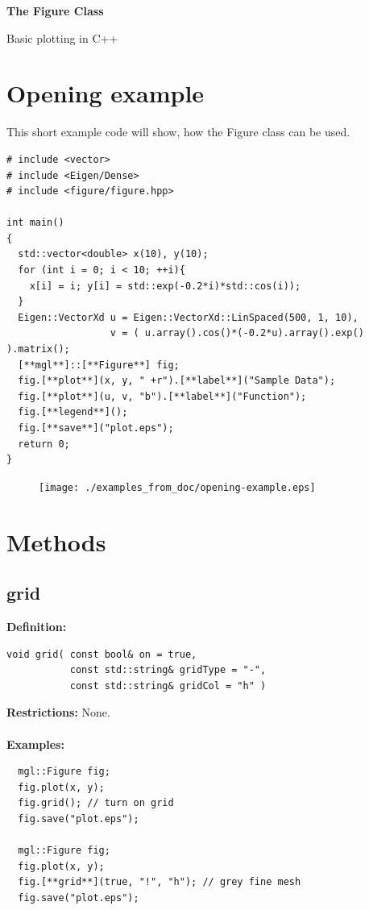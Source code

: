 \documentclass[a4paper]{article}
\newcommand{\command}[1]{\subsection{#1}}
\begin{document}
\begin{center}
  \begin{huge}
    \textbf{The Figure Class\\}
  \end{huge}
  Basic plotting in C++
\end{center}
  
\vspace*{3cm}
  \tableofcontents
\vspace*{\fill}


\section{Opening example}

This short example code will show, how the Figure class can be used.
\begin{lstlisting}
# include <vector>
# include <Eigen/Dense>
# include <figure/figure.hpp>

int main()
{
  std::vector<double> x(10), y(10);
  for (int i = 0; i < 10; ++i){ 
    x[i] = i; y[i] = std::exp(-0.2*i)*std::cos(i));
  }
  Eigen::VectorXd u = Eigen::VectorXd::LinSpaced(500, 1, 10),
                  v = ( u.array().cos()*(-0.2*u).array().exp() ).matrix();
  [**mgl**]::[**Figure**] fig;
  fig.[**plot**](x, y, " +r").[**label**]("Sample Data");
  fig.[**plot**](u, v, "b").[**label**]("Function");
  fig.[**legend**]();
  fig.[**save**]("plot.eps");
  return 0;
}
\end{lstlisting}

\begin{figure}[h]
  \centering
  \texttt{[image: ./examples\_from\_doc/opening-example.eps]}
  \thispagestyle{empty}
\end{figure}

\restoregeometry
\section{Methods}

\command{grid}

\textbf{Definition:}
\begin{lstlisting}
void grid( const bool& on = true,
           const std::string& gridType = "-", 
           const std::string& gridCol = "h" )
\end{lstlisting}
%
\textbf{Restrictions:} None. \\ \\
%
\textbf{Examples:}
\begin{lstlisting}
  mgl::Figure fig;
  fig.plot(x, y);
  fig.grid(); // turn on grid
  fig.save("plot.eps");

  mgl::Figure fig;
  fig.plot(x, y);
  fig.[**grid**](true, "!", "h"); // grey fine mesh
  fig.save("plot.eps");
\end{lstlisting}
\end{document}
